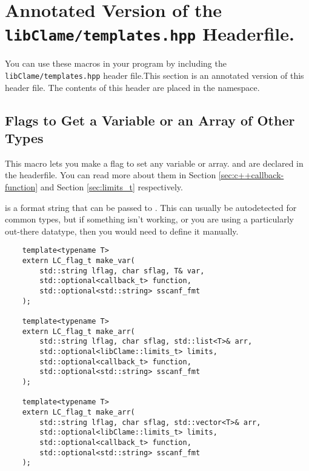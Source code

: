%
%
%

\section{Annotated Version of the \texttt{libClame/templates.hpp} Headerfile.}

You can use these macros in your program by including the \texttt{libClame/templates.hpp} header file.\footnotemark This section is an annotated version of this header file. The contents of this header are placed in the  namespace.


\subsection{Flags to Get a Variable or an Array of Other Types}
This macro lets you make a flag to set any variable or array.  and  are declared in the  headerfile. You can read more about them in Section \ref{sec:c++callback-function} and Section \ref{sec:limits_t} respectively.

 is a format string that can be passed to . This can usually be autodetected for common types, but if something isn't working, or you are using a particularly out-there datatype, then you would need to define it manually.

\begin{verbatim}
	template<typename T>
	extern LC_flag_t make_var(
		std::string lflag, char sflag, T& var,
		std::optional<callback_t> function,
		std::optional<std::string> sscanf_fmt
	);

	template<typename T>
	extern LC_flag_t make_arr(
		std::string lflag, char sflag, std::list<T>& arr,
		std::optional<libClame::limits_t> limits,
		std::optional<callback_t> function,
		std::optional<std::string> sscanf_fmt
	);

	template<typename T>
	extern LC_flag_t make_arr(
		std::string lflag, char sflag, std::vector<T>& arr,
		std::optional<libClame::limits_t> limits,
		std::optional<callback_t> function,
		std::optional<std::string> sscanf_fmt
	);
\end{verbatim}

